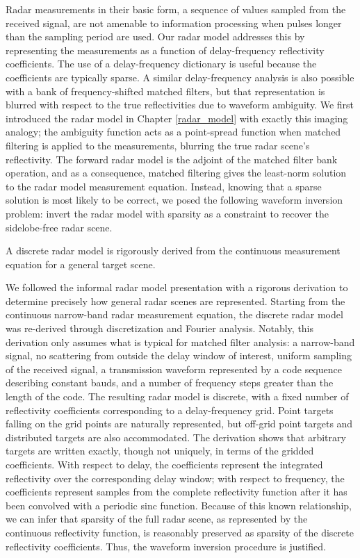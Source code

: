 Radar measurements in their basic form, a sequence of values sampled from the received signal, are not amenable to information processing when pulses longer than the sampling period are used. Our radar model addresses this by representing the measurements as a function of delay-frequency reflectivity coefficients. The use of a delay-frequency dictionary is useful because the coefficients are typically sparse. A similar delay-frequency analysis is also possible with a bank of frequency-shifted matched filters, but that representation is blurred with respect to the true reflectivities due to waveform ambiguity. We first introduced the radar model in Chapter \ref{radar_model} with exactly this imaging analogy; the ambiguity function acts as a point-spread function when matched filtering is applied to the measurements, blurring the true radar scene's reflectivity. The forward radar model is the adjoint of the matched filter bank operation, and as a consequence, matched filtering gives the least-norm solution to the radar model measurement equation. Instead, knowing that a sparse solution is most likely to be correct, we posed the following waveform inversion problem: invert the radar model with sparsity as a constraint to recover the sidelobe-free radar scene.

\begin{italicquote}
 A discrete radar model is rigorously derived from the continuous measurement equation for a general target scene.
\end{italicquote}

We followed the informal radar model presentation with a rigorous derivation to determine precisely how general radar scenes are represented. Starting from the continuous narrow-band radar measurement equation, the discrete radar model was re-derived through discretization and Fourier analysis. Notably, this derivation only assumes what is typical for matched filter analysis: a narrow-band signal, no scattering from outside the delay window of interest, uniform sampling of the received signal, a transmission waveform represented by a code sequence describing constant bauds, and a number of frequency steps greater than the length of the code. The resulting radar model is discrete, with a fixed number of reflectivity coefficients corresponding to a delay-frequency grid. Point targets falling on the grid points are naturally represented, but off-grid point targets and distributed targets are also accommodated. The derivation shows that arbitrary targets are written exactly, though not uniquely, in terms of the gridded coefficients. With respect to delay, the coefficients represent the integrated reflectivity over the corresponding delay window; with respect to frequency, the coefficients represent samples from the complete reflectivity function after it has been convolved with a periodic sinc function. Because of this known relationship, we can infer that sparsity of the full radar scene, as represented by the continuous reflectivity function, is reasonably preserved as sparsity of the discrete reflectivity coefficients. Thus, the waveform inversion procedure is justified.

